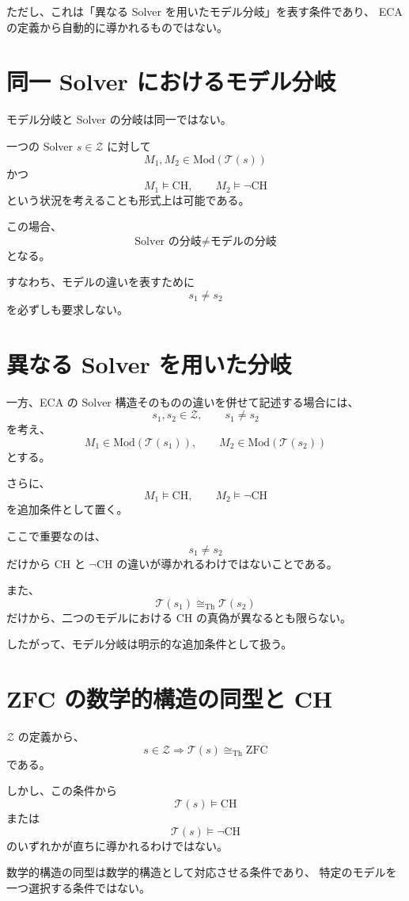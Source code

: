 \documentclass[a4paper,11pt]{article}
\newcommand{\Mod}{\mathrm{Mod}}
\begin{document}
ただし、これは「異なる Solver を用いたモデル分岐」を表す条件であり、
ECA の定義から自動的に導かれるものではない。

\section{同一 Solver におけるモデル分岐}

モデル分岐と Solver の分岐は同一ではない。

一つの Solver $s\in\mathcal{Z}$ に対して
\[
M_1,M_2\in\Mod(\mathcal{T}(s))
\]
かつ
\[
M_1\models\mathrm{CH},
\qquad
M_2\models\neg\mathrm{CH}
\]
という状況を考えることも形式上は可能である。

この場合、
\[
\boxed{\text{Solver の分岐}\neq\text{モデルの分岐}}
\]
となる。

すなわち、モデルの違いを表すために
\[
s_1\neq s_2
\]
を必ずしも要求しない。

\section{異なる Solver を用いた分岐}

一方、ECA の Solver 構造そのものの違いを併せて記述する場合には、
\[
s_1,s_2\in\mathcal{Z},
\qquad s_1\neq s_2
\]
を考え、
\[
M_1\in\Mod(\mathcal{T}(s_1)),
\qquad
M_2\in\Mod(\mathcal{T}(s_2))
\]
とする。

さらに、
\[
M_1\models\mathrm{CH},
\qquad
M_2\models\neg\mathrm{CH}
\]
を追加条件として置く。

ここで重要なのは、
\[
s_1\neq s_2
\]
だけから CH と $\neg$CH の違いが導かれるわけではないことである。

また、
\[
\mathcal{T}(s_1)\cong_{\mathrm{Th}}\mathcal{T}(s_2)
\]
だけから、二つのモデルにおける CH の真偽が異なるとも限らない。

したがって、モデル分岐は明示的な追加条件として扱う。

\section{ZFC の数学的構造の同型と CH}

$\mathcal{Z}$ の定義から、
\[
s\in\mathcal{Z}
\Longrightarrow
\mathcal{T}(s)\cong_{\mathrm{Th}}\mathrm{ZFC}
\]
である。

しかし、この条件から
\[
\mathcal{T}(s)\models\mathrm{CH}
\]
または
\[
\mathcal{T}(s)\models\neg\mathrm{CH}
\]
のいずれかが直ちに導かれるわけではない。

数学的構造の同型は数学的構造として対応させる条件であり、
特定のモデルを一つ選択する条件ではない。
\end{document}
